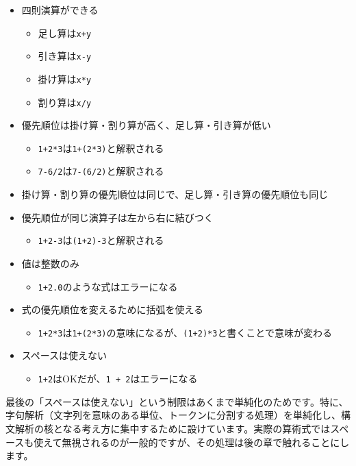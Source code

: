 \begin{itemize}
\item
  四則演算ができる

  \begin{itemize}
  \item
    足し算は\texttt{x+y}
  \item
    引き算は\texttt{x-y}
  \item
    掛け算は\texttt{x*y}
  \item
    割り算は\texttt{x/y}
  \end{itemize}
\item
  優先順位は掛け算・割り算が高く、足し算・引き算が低い

  \begin{itemize}
  \item
    \texttt{1+2*3}は\texttt{1+(2*3)}と解釈される
  \item
    \texttt{7-6/2}は\texttt{7-(6/2)}と解釈される
  \end{itemize}
\item
  掛け算・割り算の優先順位は同じで、足し算・引き算の優先順位も同じ
\item
  優先順位が同じ演算子は左から右に結びつく
  \begin{itemize}
  \item
    \texttt{1+2-3}は\texttt{(1+2)-3}と解釈される
  \end{itemize}
\item
  値は整数のみ
  \begin{itemize}
  \item
    \texttt{1+2.0}のような式はエラーになる
  \end{itemize}
\item
  式の優先順位を変えるために括弧を使える
  \begin{itemize}
  \item
    \texttt{1+2*3}は\texttt{1+(2*3)}の意味になるが、\texttt{(1+2)*3}と書くことで意味が変わる
  \end{itemize}
\item
  スペースは使えない
  \begin{itemize}
  \item
    \texttt{1+2}はOKだが、\texttt{1\ +\ 2}はエラーになる
  \end{itemize}
\end{itemize}

最後の「スペースは使えない」という制限はあくまで単純化のためです。特に、字句解析（文字列を意味のある単位、トークンに分割する処理）を単純化し、構文解析の核となる考え方に集中するために設けています。実際の算術式ではスペースも使えて無視されるのが一般的ですが、その処理は後の章で触れることにします。

